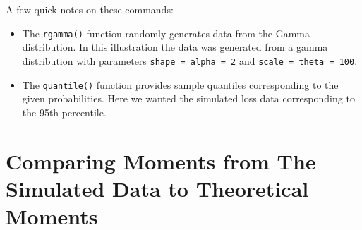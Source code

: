 \documentclass[]{book}
\providecommand{\tightlist}{%
  \setlength{\itemsep}{0pt}\setlength{\parskip}{0pt}}
\theoremstyle{definition}
\theoremstyle{definition}
\theoremstyle{definition}
\theoremstyle{remark}
\begin{document}
A few quick notes on these commands:

\begin{itemize}
\tightlist
\item
  The \texttt{rgamma()} function randomly generates data from the Gamma
  distribution. In this illustration the data was generated from a gamma
  distribution with parameters \texttt{shape\ =\ alpha\ =\ 2} and
  \texttt{scale\ =\ theta\ =\ 100}.
\item
  The \texttt{quantile()} function provides sample quantiles
  corresponding to the given probabilities. Here we wanted the simulated
  loss data corresponding to the 95th percentile.
\end{itemize}

\section{Comparing Moments from The Simulated Data to Theoretical
Moments}\label{comparing-moments-from-the-simulated-data-to-theoretical-moments}
\end{document}
